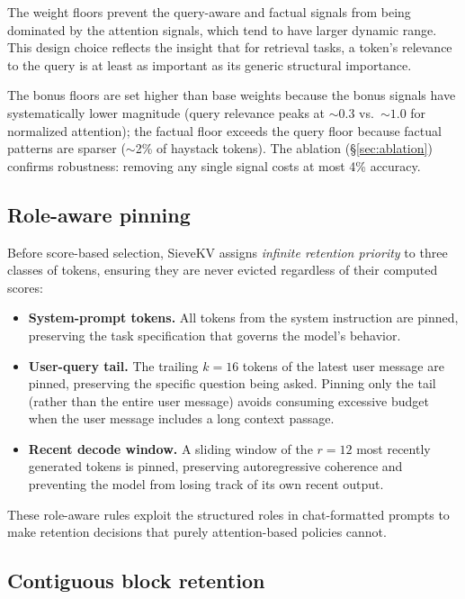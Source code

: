 \documentclass[runningheads]{llncs}
\begin{document}
The weight floors prevent the query-aware and factual signals from being
dominated by the attention signals, which tend to have larger dynamic range.
This design choice reflects the insight that for retrieval tasks, a token's
relevance to the query is at least as important as its generic structural
importance.

The bonus floors are set higher than base weights because the bonus signals
have systematically lower magnitude (query relevance peaks at ${\sim}0.3$
vs.\ ${\sim}1.0$ for normalized attention); the factual floor exceeds
the query floor because factual patterns are sparser (${\sim}$2\% of
haystack tokens).
The ablation (\S\ref{sec:ablation}) confirms robustness: removing any
single signal costs at most 4\% accuracy.

\subsection{Role-aware pinning}
\label{sec:pinning}

Before score-based selection, SieveKV assigns \emph{infinite retention
priority} to three classes of tokens, ensuring they are never evicted
regardless of their computed scores:

\begin{itemize}
\item \textbf{System-prompt tokens.}
  All tokens from the system instruction are pinned, preserving the task
  specification that governs the model's behavior.

\item \textbf{User-query tail.}
  The trailing $k{=}16$ tokens of the latest user message are pinned,
  preserving the specific question being asked.
  Pinning only the tail (rather than the entire user message) avoids
  consuming excessive budget when the user message includes a long context
  passage.

\item \textbf{Recent decode window.}
  A sliding window of the $r{=}12$ most recently generated tokens is
  pinned, preserving autoregressive coherence and preventing the model
  from losing track of its own recent output.
\end{itemize}

These role-aware rules exploit the structured roles in chat-formatted
prompts to make retention decisions that purely attention-based policies
cannot.

\subsection{Contiguous block retention}
\label{sec:blocks}
\end{document}

